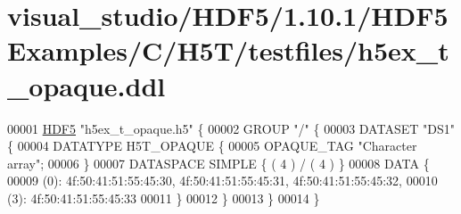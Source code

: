 \hypertarget{visual__studio_2_h_d_f5_21_810_81_2_h_d_f5_examples_2_c_2_h5_t_2testfiles_2h5ex__t__opaque_8ddl_source}{}\section{visual\+\_\+studio/\+H\+D\+F5/1.10.1/\+H\+D\+F5\+Examples/\+C/\+H5\+T/testfiles/h5ex\+\_\+t\+\_\+opaque.ddl}
\label{visual__studio_2_h_d_f5_21_810_81_2_h_d_f5_examples_2_c_2_h5_t_2testfiles_2h5ex__t__opaque_8ddl_source}

\begin{DoxyCode}
00001 \hyperlink{namespace_h_d_f5}{HDF5} \textcolor{stringliteral}{"h5ex\_t\_opaque.h5"} \{
00002 GROUP \textcolor{stringliteral}{"/"} \{
00003    DATASET \textcolor{stringliteral}{"DS1"} \{
00004       DATATYPE  H5T\_OPAQUE \{
00005          OPAQUE\_TAG \textcolor{stringliteral}{"Character array"};
00006       \}
00007       DATASPACE  SIMPLE \{ ( 4 ) / ( 4 ) \}
00008       DATA \{
00009       (0): 4f:50:41:51:55:45:30, 4f:50:41:51:55:45:31, 4f:50:41:51:55:45:32,
00010       (3): 4f:50:41:51:55:45:33
00011       \}
00012    \}
00013 \}
00014 \}
\end{DoxyCode}
